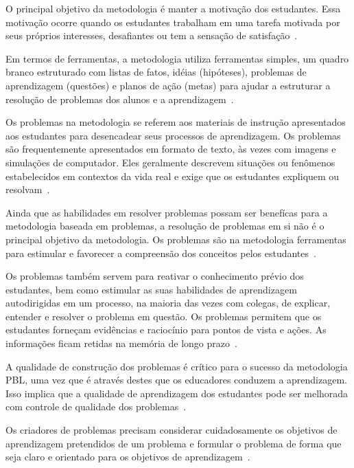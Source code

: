 O principal objetivo da metodologia é manter a motivação
dos estudantes.
Essa motivação ocorre quando os estudantes trabalham em
uma tarefa motivada por seus próprios interesses, desafiantes
ou tem a sensação de satisfação~\cite{hmelo2004problem}.

Em termos de ferramentas, a metodologia utiliza ferramentas simples,
um quadro branco estruturado com listas de fatos,
idéias (hipóteses), problemas de aprendizagem (questões)
e planos de ação (metas) para ajudar a estruturar a
resolução de problemas dos alunos e a
aprendizagem~\cite{hmelo2004problem}. 

Os problemas na metodologia se referem aos materiais de instrução apresentados
aos estudantes para desencadear seus processos de aprendizagem.
Os problemas são frequentemente apresentados em formato de texto,
às vezes com imagens e simulações de computador.
Eles geralmente descrevem situações ou fenômenos estabelecidos
em contextos da vida real e exige que os estudantes expliquem ou
resolvam~\cite{hmelo2004problem}.

Ainda que as habilidades em resolver problemas possam ser benefícas
para a metodologia baseada em problemas, a resolução de problemas em si não é o
principal objetivo da metodologia.
Os problemas são na metodologia ferramentas para estimular e
favorecer a compreensão dos conceitos pelos
estudantes~\cite{wood2003problem, amos1998problem}.

Os problemas também servem para reativar o conhecimento prévio dos
estudantes, bem como estimular as suas habilidades de aprendizagem
autodirigidas em um processo, na maioria das vezes com colegas,
de explicar, entender e resolver o problema em
questão.
Os problemas permitem que os estudantes forneçam evidências
e raciocínio para pontos de vista e ações.
As informações ficam retidas na memória de longo
prazo~\cite{des1999delphi, azer2012twelve}.

A qualidade de construção dos problemas é crítico para o
sucesso da metodologia PBL, uma vez que é através destes
que os educadores conduzem a
aprendizagem.
Isso implica que a qualidade de aprendizagem dos estudantes
pode ser melhorada com controle de qualidade dos
problemas~\cite{santos2009analisa,des1999delphi,dolmans1997seven}.

Os criadores de problemas precisam considerar cuidadosamente
os objetivos de aprendizagem pretendidos de um problema
e formular o problema de forma que seja claro e
orientado para os objetivos
de aprendizagem~\cite{sockalingam2011student}.

